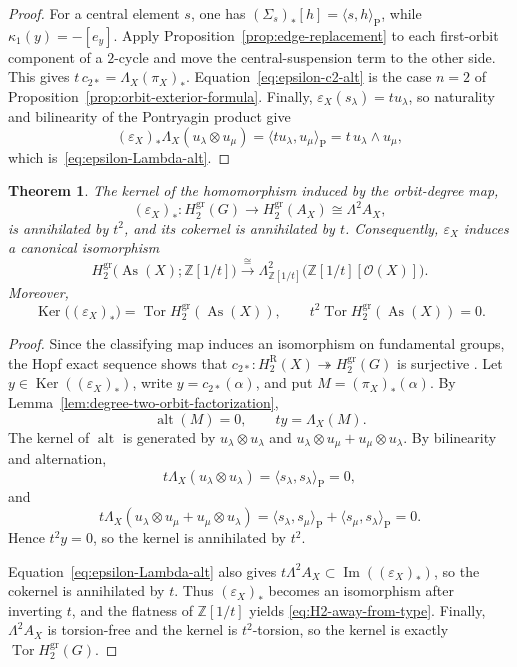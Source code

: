 \documentclass[10pt,a4paper]{amsart}
\newtheorem{theorem}{Theorem}[section]
\DeclareMathOperator{\As}{As}
\DeclareMathOperator{\Tor}{Tor}
\DeclareMathOperator{\Ker}{Ker}
\newcommand{\ZZ}{\mathbb Z}
\newcommand{\OO}{\mathcal O}
\newcommand{\gr}{\mathrm{gr}}
\newcommand{\R}{\mathrm R}
\begin{document}
\begin{proof}
For a central element $s$, one has
$(\Sigma_s)_*[h]=\langle s,h\rangle_{\mathrm P}$, while
$\kappa_1(y)=-[e_y]$. Apply Proposition~\ref{prop:edge-replacement} to each
first-orbit component of a $2$-cycle and move the central-suspension term to
the other side. This gives
$t\,c_{2*}=\Lambda_X(\pi_X)_*$. Equation~\eqref{eq:epsilon-c2-alt} is the case
$n=2$ of Proposition~\ref{prop:orbit-exterior-formula}. Finally,
$\varepsilon_X(s_\lambda)=t u_\lambda$, so naturality and bilinearity of the
Pontryagin product give
\[
 (\varepsilon_X)_*\Lambda_X(u_\lambda\otimes u_\mu)
 =\langle t u_\lambda,u_\mu\rangle_{\mathrm P}
 =t\,u_\lambda\wedge u_\mu,
\]
which is~\eqref{eq:epsilon-Lambda-alt}.
\end{proof}

\begin{theorem}
\label{thm:H2-away-from-type}
The kernel of the homomorphism induced by the orbit-degree map,
\[
 (\varepsilon_X)_*\colon H_2^{\gr}(G)
 \longrightarrow H_2^{\gr}(A_X)\cong\Lambda^2A_X,
\]
is annihilated by $t^2$, and its cokernel is annihilated by $t$.
Consequently, $\varepsilon_X$ induces a canonical isomorphism
\begin{equation}
 H_2^{\gr}\bigl(\As(X);\ZZ[1/t]\bigr)
 \xrightarrow{\ \cong\ }
 \Lambda^2_{\ZZ[1/t]}\bigl(\ZZ[1/t][\OO(X)]\bigr).
 \label{eq:H2-away-from-type}
\end{equation}
Moreover,
\[
 \Ker\bigl((\varepsilon_X)_*\bigr)=\Tor H_2^{\gr}(\As(X)),
 \qquad
 t^2\Tor H_2^{\gr}(\As(X))=0.
\]
\end{theorem}

\begin{proof}
Since the classifying map induces an isomorphism on fundamental groups, the
Hopf exact sequence shows that
$c_{2*}\colon H_2^\R(X)\twoheadrightarrow H_2^{\gr}(G)$ is surjective
\cite[Chapter~II, \S5]{Brown}. Let
$y\in\Ker((\varepsilon_X)_*)$, write $y=c_{2*}(\alpha)$, and put
$M=(\pi_X)_*(\alpha)$. By
Lemma~\ref{lem:degree-two-orbit-factorization},
\[
 \operatorname{alt}(M)=0,
 \qquad
 ty=\Lambda_X(M).
\]
The kernel of $\operatorname{alt}$ is generated by
$u_\lambda\otimes u_\lambda$ and
$u_\lambda\otimes u_\mu+u_\mu\otimes u_\lambda$. By bilinearity and
alternation,
\[
 t\Lambda_X(u_\lambda\otimes u_\lambda)
 =\langle s_\lambda,s_\lambda\rangle_{\mathrm P}=0,
\]
and
\[
 t\Lambda_X(u_\lambda\otimes u_\mu+u_\mu\otimes u_\lambda)
 =\langle s_\lambda,s_\mu\rangle_{\mathrm P}
 +\langle s_\mu,s_\lambda\rangle_{\mathrm P}=0.
\]
Hence $t^2y=0$, so the kernel is annihilated by $t^2$.

Equation~\eqref{eq:epsilon-Lambda-alt} also gives
$t\Lambda^2A_X\subset\operatorname{Im}((\varepsilon_X)_*)$, so the cokernel
is annihilated by $t$. Thus $(\varepsilon_X)_*$ becomes an isomorphism after
inverting $t$, and the flatness of $\ZZ[1/t]$ yields
\eqref{eq:H2-away-from-type}. Finally, $\Lambda^2A_X$ is torsion-free and the kernel is $t^2$-torsion,
so the kernel is exactly $\Tor H_2^{\gr}(G)$.
\end{proof}
\end{document}
